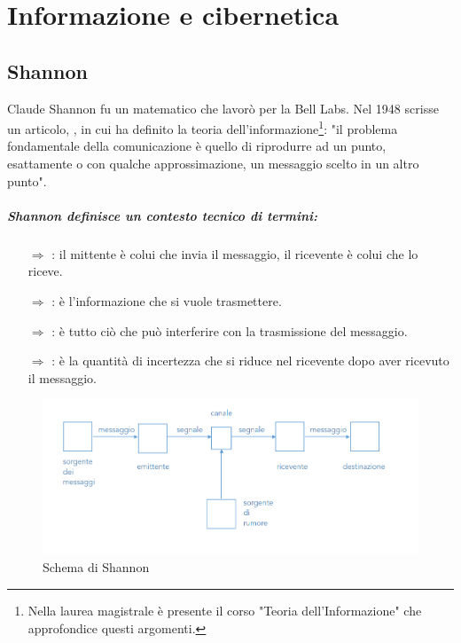 \chapter{Informazione e cibernetica}

\section{Shannon}

Claude Shannon fu un matematico che lavorò per la Bell Labs.  Nel 1948 scrisse un articolo,
, in cui ha definito la teoria dell'informazione\footnote{Nella laurea magistrale è presente il corso "Teoria dell'Informazione" che approfondice questi argomenti.}: 
"il problema fondamentale della comunicazione è quello di 
riprodurre ad un punto, esattamente o con qualche approssimazione, un messaggio
scelto in un altro punto".

\paragraph{Shannon definisce un contesto tecnico di termini:}
\begin{itemize}
    \item [$\Rightarrow$] : il mittente è colui che invia il messaggio, il ricevente è colui che lo riceve.
    \item [$\Rightarrow$] : è l'informazione che si vuole trasmettere.
    \item [$\Rightarrow$] : è tutto ciò che può interferire con la trasmissione del messaggio.
    \item [$\Rightarrow$] : è la quantità di incertezza che si riduce nel ricevente dopo aver ricevuto il messaggio.
\end{itemize}



\begin{figure}[h]
    \centering
    \includegraphics[scale=0.35]{images/Shannon.png}
    \caption{Schema di Shannon}
\end{figure}

